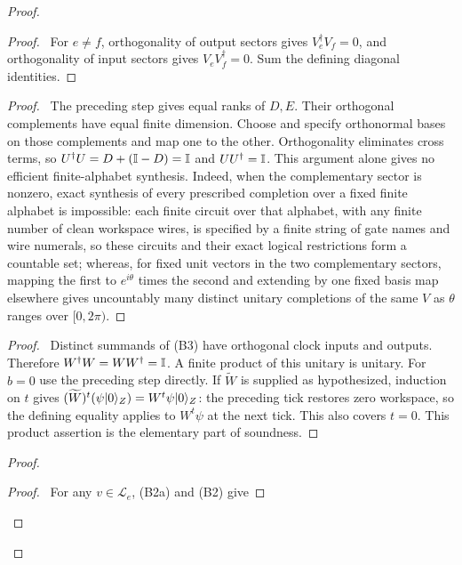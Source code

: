 \begin{proof}
 \begin{proof}\pf\ For $e\ne f$, orthogonality of output sectors gives
 $V_e^\dagger V_f=0$, and orthogonality of input sectors gives
 $V_eV_f^\dagger=0$. Sum the defining diagonal identities.\end{proof}
 \begin{proof}\pf\ The preceding step gives equal ranks of $D,E$.
 Their orthogonal complements have equal finite dimension. Choose and
 specify orthonormal bases on those complements and map one to the other.
 Orthogonality eliminates cross terms, so
 $U^\dagger U=D+(\mathbb{I}-D)=\mathbb{I}$ and $UU^\dagger=\mathbb{I}$.
 This argument alone gives no efficient finite-alphabet synthesis.
 Indeed, when the complementary sector is nonzero, exact synthesis of
every prescribed completion over a fixed finite alphabet is
impossible: each finite circuit over that alphabet, with any finite
number of clean workspace wires, is specified by a finite string of
gate names and wire numerals, so these circuits and their exact
logical restrictions form a countable set; whereas, for fixed unit
vectors in the two complementary sectors, mapping the first to
$e^{i\theta}$ times the second and extending by one fixed basis map
elsewhere gives uncountably many distinct unitary completions of the
same $V$ as $\theta$ ranges over $[0,2\pi)$.
 \end{proof}
 \begin{proof}\pf\ Distinct summands of (B3) have orthogonal clock
 inputs and outputs. Therefore $W^\dagger W=WW^\dagger=\mathbb{I}$.
 A finite product of this unitary is unitary. For $b=0$ use the preceding
 step directly. If $\widetilde W$ is supplied as hypothesized, induction
 on $t$ gives $(\widetilde W)^t(\psi\lvert 0\rangle_Z)=W^t\psi\lvert 0\rangle_Z$:
 the preceding tick restores zero workspace, so the defining equality
 applies to $W^t\psi$ at the next tick. This also covers $t=0$.
 This product assertion is the elementary part of soundness.\end{proof}
 \begin{proof}
  \begin{proof}\pf\ For any $v\in\mathcal L_e$, (B2a) and (B2) give

\end{proof}
\end{proof}
\end{proof}
